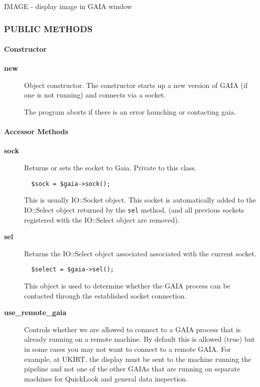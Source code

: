 IMAGE - display image in GAIA window

\subsubsection*{PUBLIC METHODS\label{ORAC::Display::GAIA_PUBLIC_METHODS}}\paragraph*{Constructor\label{ORAC::Display::GAIA_Constructor}}\begin{description}
\item[\textbf{new}] \mbox{}

Object constructor. The constructor starts up a new version of
GAIA (if one is not running) and connects via a socket.



The program aborts if there is an error launching or contacting
gaia.

\end{description}
\paragraph*{Accessor Methods\label{ORAC::Display::GAIA_Accessor_Methods}}\begin{description}
\item[\textbf{sock}] \mbox{}

Returns or sets the socket to Gaia. Private to this class.

\begin{verbatim}
  $sock = $gaia->sock();
\end{verbatim}


This is usually IO::Socket object. This socket is automatically
added to the IO::Select object returned by the \texttt{sel} method.
(and all previous sockets registered with the IO::Select object
are removed).

\item[\textbf{sel}] \mbox{}

Returns the IO::Select object associated associated with the
current socket.

\begin{verbatim}
  $select = $gaia->sel();
\end{verbatim}


This object is used to determine whether the GAIA process can be
contacted through the established socket connection.

\item[\textbf{use\_remote\_gaia}] \mbox{}

Controls whether we are allowed to connect to a GAIA process that
is already running on a remote machine. By default this is allowed
(true) but in some cases you may not want to connect to a remote
GAIA. For example, at UKIRT, the display must be sent to the machine
running the pipeline and not one of the other GAIAs that are running
on separate machines for QuickLook and general data inspection.

\end{description}
